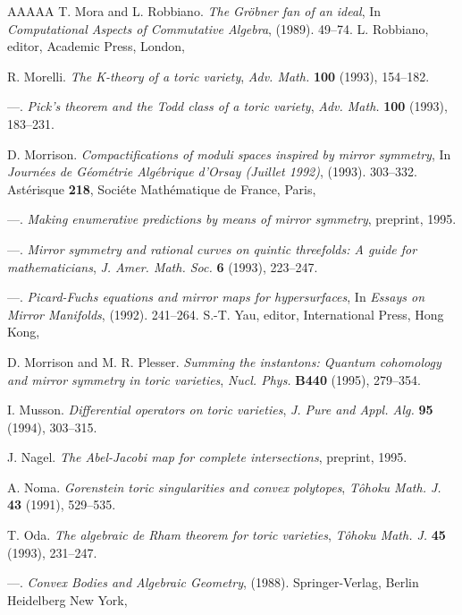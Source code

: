 \documentclass{amsart}
\theoremstyle{plain}
\theoremstyle{definition}
\begin{document}
\begin{thebibliography}{AAAAA}
T. Mora and L. Robbiano. \textit{The Gr\"obner fan of an ideal}, In \textit{Computational Aspects of Commutative Algebra}, (1989). 49--74. L. Robbiano, editor, Academic Press, London,

R. Morelli. \textit{The K-theory of a toric variety}, \textit{Adv. Math.} \textbf{100} (1993), 154--182.

---. \textit{Pick's theorem and the Todd class of a toric variety}, \textit{Adv. Math.} \textbf{100} (1993), 183--231.

D. Morrison. \textit{Compactifications of moduli spaces inspired by mirror symmetry}, In \textit{Journ\'ees de G\'eom\'etrie Alg\'ebrique d'Orsay (Juillet 1992)}, (1993). 303--332. Ast\'erisque \textbf{218}, Soci\'ete Math\'ematique de France, Paris,

---. \textit{Making enumerative predictions by means of mirror symmetry}, preprint, 1995.

---. \textit{Mirror symmetry and rational curves on quintic threefolds: A guide for mathematicians}, \textit{J. Amer. Math. Soc.} \textbf{6} (1993), 223--247.

---. \textit{Picard-Fuchs equations and mirror maps for hypersurfaces}, In \textit{Essays on Mirror Manifolds}, (1992). 241--264. S.-T. Yau, editor, International Press, Hong Kong,

D. Morrison and M. R. Plesser. \textit{Summing the instantons: Quantum cohomology and mirror symmetry in toric varieties}, \textit{Nucl. Phys.} \textbf{B440} (1995), 279--354.

I. Musson. \textit{Differential operators on toric varieties}, \textit{J. Pure and Appl. Alg.} \textbf{95} (1994), 303--315.

J. Nagel. \textit{The Abel-Jacobi map for complete intersections}, preprint, 1995.

A. Noma. \textit{Gorenstein toric singularities and convex polytopes}, \textit{T\^ ohoku Math. J.} \textbf{43} (1991), 529--535.

T. Oda. \textit{The algebraic de Rham theorem for toric varieties}, \textit{T\^ ohoku Math. J.} \textbf{45} (1993), 231--247.

---. \textit{Convex Bodies and Algebraic Geometry}, (1988). Springer-Verlag, Berlin Heidelberg New York,


\end{thebibliography}
\end{document}
